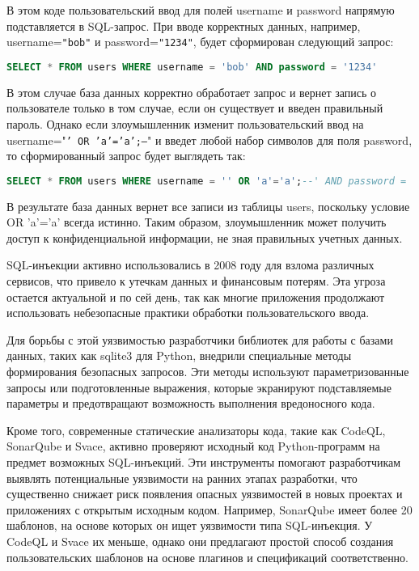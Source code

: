 \documentclass[a4paper,12pt]{article} %
\begin{document}
			\par В этом коде пользовательский ввод для полей username и password напрямую подставляется в SQL-запрос. При вводе корректных данных, например, username=\texttt{"bob"} и password=\texttt{"1234"}, будет сформирован следующий запрос:

			\begin{lstlisting}[language=SQL]
SELECT * FROM users WHERE username = 'bob' AND password = '1234'
			\end{lstlisting}

			В этом случае база данных корректно обработает запрос и вернет запись о пользователе только в том случае, если он существует и введен правильный пароль. Однако если злоумышленник изменит пользовательский ввод на username="\texttt{' OR 'a'='a';--}" и введет любой набор символов для поля password, то сформированный запрос будет выглядеть так:

			\begin{lstlisting}[language=SQL]
SELECT * FROM users WHERE username = '' OR 'a'='a';--' AND password = ' '
			\end{lstlisting}

			В результате база данных вернет все записи из таблицы users, поскольку условие OR 'a'='a' всегда истинно. Таким образом, злоумышленник может получить доступ к конфиденциальной информации, не зная правильных учетных данных.

			\par SQL-инъекции активно использовались в 2008 году для взлома различных сервисов, что привело к утечкам данных и финансовым потерям. Эта угроза остается актуальной и по сей день, так как многие приложения продолжают использовать небезопасные практики обработки пользовательского ввода.

			\par Для борьбы с этой уязвимостью разработчики библиотек для работы с базами данных, таких как sqlite3 для Python, внедрили специальные методы формирования безопасных запросов. Эти методы используют параметризованные запросы или подготовленные выражения, которые экранируют подставляемые параметры и предотвращают возможность выполнения вредоносного кода.

			\par Кроме того, современные статические анализаторы кода, такие как CodeQL, SonarQube и Svace, активно проверяют исходный код Python-программ на предмет возможных SQL-инъекций. Эти инструменты помогают разработчикам выявлять потенциальные уязвимости на ранних этапах разработки, что существенно снижает риск появления опасных уязвимостей в новых проектах и приложениях с открытым исходным кодом. Например, SonarQube имеет более 20 шаблонов, на основе которых он ищет уязвимости типа SQL-инъекция. У CodeQL и Svace их меньше, однако они предлагают простой способ создания пользовательских шаблонов на основе плагинов и спецификаций соответственно.
\end{document}

